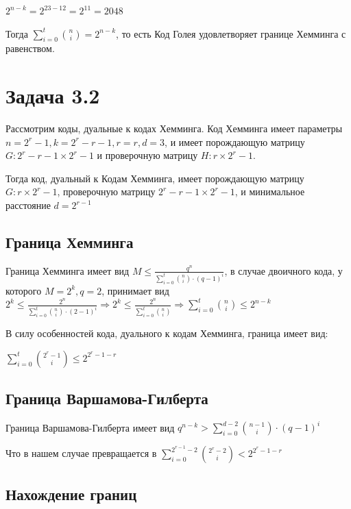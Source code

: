 \documentclass{article}
\begin{document}
	$2^{n - k} = 2^{23 - 12} = 2^11 = 2048$
	
	Тогда $ \sum\limits_{i = 0}^t \binom{n}{i} = 2^{n - k}$, то есть Код Голея удовлетворяет границе Хемминга с равенством.
	
	\section{Задача 3.2}
	
	Рассмотрим коды, дуальные к кодах Хемминга. Код Хемминга имеет параметры $n = 2^r - 1, k = 2^r - r - 1, r = r, d = 3$, и имеет порождающую матрицу $G: 2^r - r - 1 \times 2^r - 1$ и проверочную матрицу $H: r \times 2^r - 1$.
	
	Тогда код, дуальный к Кодам Хемминга, имеет порождающую матрицу $G: r \times 2^r - 1$, проверочную матрицу $2^r - r - 1 \times 2^r - 1$, и минимальное расстояние $d = 2^{r - 1}$
	
	\subsection{Граница Хемминга}
	
	Граница Хемминга имеет вид $M \leq \frac{q^n}{\sum\limits_{i = 0}^t \binom{n}{i} \cdot (q - 1)^i}$, в случае двоичного кода, у которого $M = 2^k, q = 2$, принимает вид $2^k \leq \frac{2^n}{\sum\limits_{i = 0}^t \binom{n}{i} \cdot (2 - 1)^i} \Rightarrow 2^k \leq \frac{2^n}{\sum\limits_{i = 0}^t \binom{n}{i}} \Rightarrow \sum\limits_{i = 0}^t \binom{n}{i} \leq 2^{n - k}$
	
	В силу особенностей кода, дуального к кодам Хемминга, граница имеет вид:
	
	$ \sum\limits_{i = 0}^t \binom{2^r - 1}{i} \leq 2^{2^r - 1- r }$
	
	\subsection{Граница Варшамова-Гилберта}
	
	Граница Варшамова-Гилберта имеет вид $q^{n - k} > \sum\limits_{i = 0}^{d - 2} \binom{n - 1}{i} \cdot (q - 1)^i$
	
	Что в нашем случае превращается в $\sum\limits_{i = 0}^{2^{r - 1} - 2} \binom{2^r - 2}{i} < 2^{2^r - 1 - r}$
	
	\subsection{Нахождение границ}
	
\end{document}
